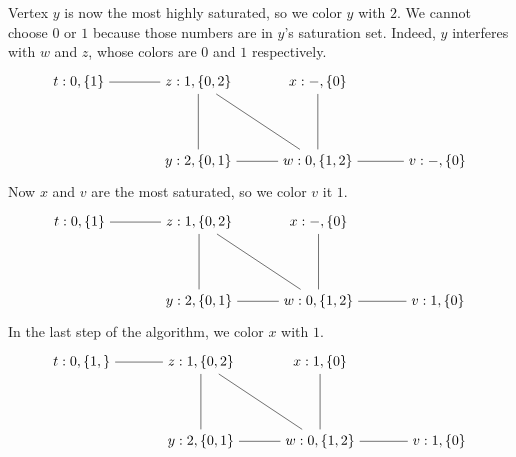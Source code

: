 \documentclass[11pt]{book}
\begin{document}
Vertex $y$ is now the most highly saturated, so we color $y$ with $2$.
We cannot choose $0$ or $1$ because those numbers are in $y$'s
saturation set. Indeed, $y$ interferes with $w$ and $z$, whose colors
are $0$ and $1$ respectively.
\[
\begin{tikzpicture}[baseline=(current  bounding  box.center)]
\node (t1) at (0,2) {$t:0,\{1\}$};
\node (z) at (3,2)  {$z:1,\{0,2\}$};
\node (x) at (6,2)  {$x:-,\{0\}$};
\node (y) at (3,0)  {$y:2,\{0,1\}$};
\node (w) at (6,0)  {$w:0,\{1,2\}$};
\node (v) at (9,0)  {$v:-,\{0\}$};

\draw (t1) to (z);
\draw (z) to (y);
\draw (z) to (w);
\draw (x) to (w);
\draw (y) to (w);
\draw (v) to (w);
\end{tikzpicture}
\]
Now $x$ and $v$ are the most saturated, so we color $v$ it $1$.
\[
\begin{tikzpicture}[baseline=(current  bounding  box.center)]
\node (t1) at (0,2) {$t:0,\{1\}$};
\node (z) at (3,2)  {$z:1,\{0,2\}$};
\node (x) at (6,2)  {$x:-,\{0\}$};
\node (y) at (3,0)  {$y:2,\{0,1\}$};
\node (w) at (6,0)  {$w:0,\{1,2\}$};
\node (v) at (9,0)  {$v:1,\{0\}$};

\draw (t1) to (z);
\draw (z) to (y);
\draw (z) to (w);
\draw (x) to (w);
\draw (y) to (w);
\draw (v) to (w);
\end{tikzpicture}
\]
In the last step of the algorithm, we color $x$ with $1$.
\[
\begin{tikzpicture}[baseline=(current  bounding  box.center)]
\node (t1) at (0,2) {$t:0,\{1,\}$};
\node (z) at (3,2)  {$z:1,\{0,2\}$};
\node (x) at (6,2)  {$x:1,\{0\}$};
\node (y) at (3,0)  {$y:2,\{0,1\}$};
\node (w) at (6,0)  {$w:0,\{1,2\}$};
\node (v) at (9,0)  {$v:1,\{0\}$};

\draw (t1) to (z);
\draw (z) to (y);
\draw (z) to (w);
\draw (x) to (w);
\draw (y) to (w);
\draw (v) to (w);
\end{tikzpicture}
\]
\end{document}
